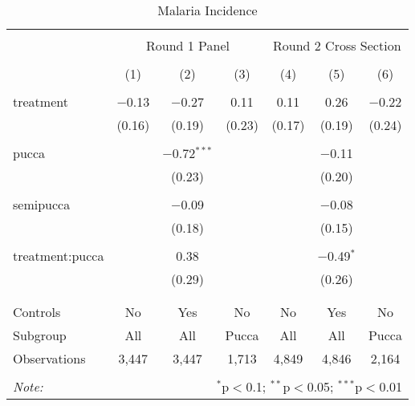 
\begin{table}[!htbp] \centering 
  \caption{Malaria Incidence} 
  \label{tbl:Malaria Incidence} 
\begin{tabular}{@{\extracolsep{5pt}}lcccccc} 
\\[-1.8ex]\hline 
\hline \\[-1.8ex] 
 & \multicolumn{3}{c}{Round 1 Panel} & \multicolumn{3}{c}{Round 2 Cross Section} \\ 
\\[-1.8ex] & (1) & (2) & (3) & (4) & (5) & (6)\\ 
\hline \\[-1.8ex] 
 treatment & $-$0.13 & $-$0.27 & 0.11 & 0.11 & 0.26 & $-$0.22 \\ 
  & (0.16) & (0.19) & (0.23) & (0.17) & (0.19) & (0.24) \\ 
  & & & & & & \\ 
 pucca &  & $-$0.72$^{***}$ &  &  & $-$0.11 &  \\ 
  &  & (0.23) &  &  & (0.20) &  \\ 
  & & & & & & \\ 
 semipucca &  & $-$0.09 &  &  & $-$0.08 &  \\ 
  &  & (0.18) &  &  & (0.15) &  \\ 
  & & & & & & \\ 
 treatment:pucca &  & 0.38 &  &  & $-$0.49$^{*}$ &  \\ 
  &  & (0.29) &  &  & (0.26) &  \\ 
  & & & & & & \\ 
\hline \\[-1.8ex] 
Controls & No & Yes & No & No & Yes & No \\ 
Subgroup & All & All & Pucca & All & All & Pucca \\ 
Observations & 3,447 & 3,447 & 1,713 & 4,849 & 4,846 & 2,164 \\ 
\hline 
\hline \\[-1.8ex] 
\textit{Note:}  & \multicolumn{6}{r}{$^{*}$p$<$0.1; $^{**}$p$<$0.05; $^{***}$p$<$0.01} \\ 
\end{tabular} 
\end{table} 
